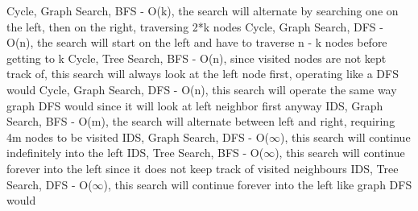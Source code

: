 \documentclass[a4paper]{article}
\begin{document}
Cycle, Graph Search, BFS - O(k), the search will alternate by searching one on the left, then on the right, traversing 2*k nodes \newline
Cycle, Graph Search, DFS - O(n), the search will start on the left and have to traverse n - k nodes before getting to k \newline
Cycle, Tree Search, BFS - O(n), since visited nodes are not kept track of, this search will always look at the left node first, operating like a DFS would \newline
Cycle, Graph Search, DFS - O(n), this search will operate the same way graph DFS would since it will look at left neighbor first anyway \newline
\newline
IDS, Graph Search, BFS - O(m), the search will alternate between left and right, requiring 4m nodes to be visited \newline
IDS, Graph Search, DFS - O($\infty$), this search will continue indefinitely into the left \newline
IDS, Tree Search, BFS - O($\infty$), this search will continue forever into the left since it does not keep track of visited neighbours \newline 
IDS, Tree Search, DFS - O(${\infty}$), this search will continue forever into the left like graph DFS would
\end{document}
